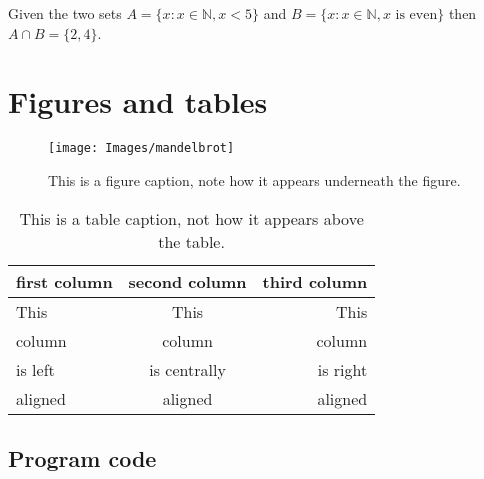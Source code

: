 \begin{example}
Given the two sets $A = \{x:x\in \mathbb{N}, x < 5\}$ and $B = \{x:x \in \mathbb{N}, x \text{ is even}\}$ then $A \cap B = \{2, 4\}$.
\end{example}


\section{Figures and tables}

\begin{figure}[H]
	\begin{center}
		\texttt{[image: Images/mandelbrot]} %
		\caption{This is a figure caption, note how it appears underneath the figure.} %
		\label{fig:figure label} %
	\end{center}
\end{figure}

\begin{table}[H]
	\caption{This is a table caption, not how it appears above the table.}
	\label{tab:table label} %
	\begin{center}
		\begin{tabular}{lcr} %
			\toprule %
			first column & second column & third column \\
			\midrule %
			This & This & This \\
			column & column & column \\
			is left & is centrally & is right \\
			aligned & aligned & aligned \\
			\bottomrule %
		\end{tabular}
	\end{center}
\end{table}

\subsection{Program code}

